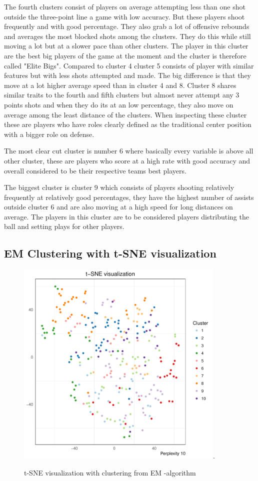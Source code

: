 \documentclass{article}
\begin{document}
The fourth clusters consist of players on average attempting less than one shot outside the three-point line a game with low accuracy. But these players shoot frequently and with good percentage. They also grab a lot of offensive rebounds and averages the most blocked shots among the clusters. They do this while still moving a lot but at a slower pace than other clusters. The player in this cluster are the best big players of the game at the moment and the cluster is therefore called "Elite Bigs". Compared to cluster 4 cluster 5 consists of player with similar features but with less shots attempted and made. The big difference is that they move at a lot higher average speed than in cluster 4 and 8. Cluster 8 shares similar traits to the fourth and fifth clusters but almost never attempt any 3 points shots and when they do its at an low percentage, they also move on average among the least distance of the clusters. When inspecting these cluster these are players who have roles clearly defined as the traditional center position with a bigger role on defense.

The most clear cut cluster is number 6 where basically every variable is above all other cluster, these are players who score at a high rate with good accuracy and overall considered to be their respective teams best players.

The biggest cluster is cluster 9 which consists of players shooting relatively frequently at relatively good percentages, they have the highest number of assists outside cluster 6 and are also moving at a high speed for long distances on average. The players in this cluster are to be considered players distributing the ball and setting plays for other players.

\subsection{EM Clustering with t-SNE visualization}

\begin{figure}[H]
 \centering
 \includegraphics[height=10cm]{tsnecluster2.pdf}.
 \caption{t-SNE visualization with clustering from EM -algorithm}
 \label{figure:2}
\end{figure}
\end{document}

